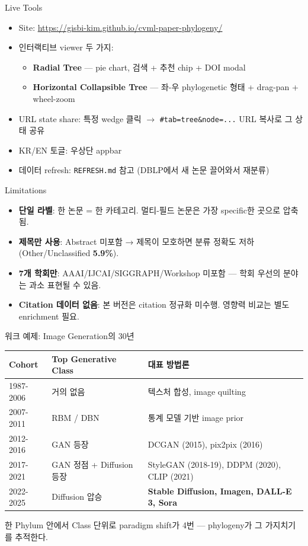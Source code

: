 \documentclass[aspectratio=169,t]{beamer}
\newcommand{\hot}[1]{\textcolor{accentorange}{\textbf{#1}}}
\newcommand{\cool}[1]{\textcolor{accentblue}{\textbf{#1}}}
\newcommand{\muted}[1]{\textcolor{mutedgray}{#1}}
\begin{document}
\begin{frame}{Live Tools}
\begin{itemize}
  \item Site: \url{https://gisbi-kim.github.io/cvml-paper-phylogeny/}
  \item 인터랙티브 viewer 두 가지:
  \begin{itemize}
    \item \cool{Radial Tree} — pie chart, 검색 + 추천 chip + DOI modal
    \item \cool{Horizontal Collapsible Tree} — 좌-우 phylogenetic 형태 + drag-pan + wheel-zoom
  \end{itemize}
  \item URL state share: 특정 wedge 클릭 $\to$ \texttt{\#tab=tree\&node=...} URL 복사로 그 상태 공유
  \item KR/EN 토글: 우상단 appbar
  \item 데이터 refresh: \texttt{REFRESH.md} 참고 (DBLP에서 새 논문 끌어와서 재분류)
\end{itemize}
\end{frame}

\begin{frame}{Limitations}
\begin{itemize}
  \item \cool{단일 라벨}: 한 논문 = 한 카테고리. 멀티-필드 논문은 가장 specific한 곳으로 압축됨.
  \item \cool{제목만 사용}: Abstract 미포함 → 제목이 모호하면 분류 정확도 저하 (Other/Unclassified \hot{5.9\%}).
  \item \cool{7개 학회만}: AAAI/IJCAI/SIGGRAPH/Workshop 미포함 — 학회 우선의 분야는 과소 표현될 수 있음.
  \item \cool{Citation 데이터 없음}: 본 버전은 citation 정규화 미수행. 영향력 비교는 별도 enrichment 필요.
\end{itemize}
\end{frame}

\begin{frame}{워크 예제: Image Generation의 30년}
\small
\begin{tabular}{@{}lll@{}}
\toprule
\textbf{Cohort} & \textbf{Top Generative Class} & \textbf{대표 방법론} \\
\midrule
1987-2006 & 거의 없음 & 텍스처 합성, image quilting \\
2007-2011 & RBM / DBN  & 통계 모델 기반 image prior \\
2012-2016 & GAN 등장   & DCGAN (2015), pix2pix (2016) \\
2017-2021 & GAN 정점 + Diffusion 등장 & StyleGAN (2018-19), DDPM (2020), CLIP (2021) \\
2022-2025 & Diffusion 압승 & \hot{Stable Diffusion, Imagen, DALL-E 3, Sora} \\
\bottomrule
\end{tabular}
\vfill
\muted{한 Phylum 안에서 Class 단위로 paradigm shift가 4번 — phylogeny가 그 가지치기를 추적한다.}
\end{frame}
\end{document}
